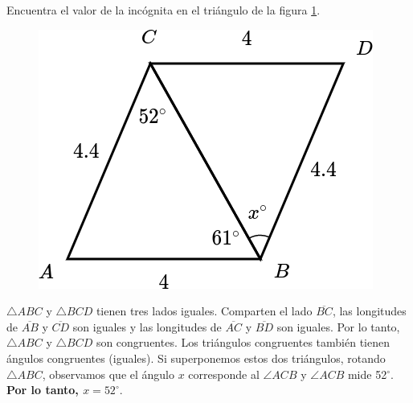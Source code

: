 Encuentra el valor de la incógnita en el triángulo de la figura \ref{fig:angle_triangle_32}.

\begin{minipage}[t][][t]{0.35\textwidth}
    \begin{figure}[H]
        \centering
        \includegraphics[width=0.9\linewidth]{../images/angle_triangle_32.png}

        \caption{}
        \label{fig:angle_triangle_32}
    \end{figure}
\end{minipage}\hfill
\begin{minipage}[t][][t]{0.6\textwidth}
    \begin{solutionbox}{4cm}
        $\triangle ABC$ y $\triangle BCD$ tienen tres lados iguales. Comparten el lado
        $\overline{BC}$, las longitudes de $\overline{AB}$ y $\overline{CD}$ son iguales y las longitudes de
        $\overline{AC}$ y $\overline{BD}$ son iguales. Por lo tanto,
        $\triangle ABC$ y $\triangle BCD$  son congruentes.
        Los triángulos congruentes también tienen ángulos congruentes (iguales). Si superponemos estos dos triángulos, rotando
        $\triangle ABC$, observamos que el ángulo $x$ corresponde al
        $\angle ACB$ y $\angle ACB$ mide
        52$^\circ$. \textbf{Por lo tanto, $x=52^\circ$}.
    \end{solutionbox}
\end{minipage}
